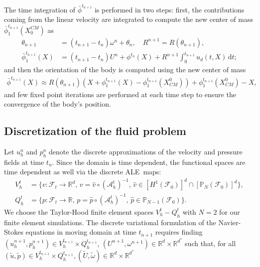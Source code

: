 \documentclass[graybox]{svmult}
\newcommand{\Fluid}{\mathcal{F}} %
\newcommand{\Alemap}{\mathcal{A}} %
\newcommand{\ALE}{ALE} %
\newcommand{\Vel}{u} %
\newcommand{\Pres}{p} %
\newcommand{\tvel}{U} %
\newcommand{\angvel}{\omega} %
\newcommand{\CompDomain}{\Fluid}
\begin{document}
The time integration of $\bar{\phi}^{t_{n+1}}$  is performed in two steps: first, the contributions coming from the linear velocity are integrated to compute the new center of mass $\bar{\phi}_1^{t_{n+1}}(X^{CM}_0) $ as
\begin{equation}
	\begin{aligned}
		\theta_{n+1}&= (t_{n+1}-t_n)\angvel^n + \theta_{n}, \quad R^{n+1} = R(\theta_{n+1}),\\
		\bar{\phi}_1^{t_{n+1}}(X) &= (t_{n+1}-t_n)\tvel^n + \phi^{t_{n}}(X) + R^{n+1}\int_0^{t_{n+1}} u_d(t,X)\, \mathrm{d}t;
	\end{aligned}
	\label{Eq:discDisp1}
\end{equation}
and then the orientation of the body is computed using the new center of mass
\begin{multline}
	\bar{\phi}^{t_{n+1}}(X) \approx  R(\theta_{n+1}) (X+\phi_1^{t_{n+1}}(X)-\phi_1^{t_{n+1}}(X_{CM}^{0})) + \phi_1^{t_{n+1}}(X_{CM}^0)-X,
	\label{Eq:discDisp2}
\end{multline}
and few fixed point iterations are performed at each time step to ensure the convergence of the body's position.


\subsection{Discretization of the fluid problem}

Let $\Vel_h^n$ and $\Pres_h^n$ denote the discrete approximations of the velocity and pressure fields at time $t_n$. Since the domain is time dependent, the functional spaces are time dependent as well via the discrete \ALE\ maps:
\begin{equation}
	\begin{aligned}
		V_h^t &= \{v: \CompDomain_t \to \mathbb{R}^d, \, v = \hat{v} \circ (\mathcal{A}_h^t)^{-1}, \, \hat{v} \in [H^1(\CompDomain_0)]^d \cap [\mathbb{P}_N(\CompDomain_0)]^d  \}, \\
		Q_h^t &= \{\Pres : \CompDomain_t \to \mathbb{R}, \, \Pres = \hat{\Pres} \circ (\Alemap_h^t)^{-1}, \, \hat{\Pres} \in\mathbb{P}_{N-1}(\CompDomain_0) \}.
	\end{aligned}
	\label{Eq:FEMspace}
\end{equation}
We choose the Taylor-Hood finite element spaces $V_h^t -Q_h^t $ with $N=2$ for our finite element simulations.
The discrete variational formulation of the Navier-Stokes equations in moving domain at time $t_{n+1}$ requires finding $(\Vel_h^{n+1}, \Pres_h^{n+1}) \in V_h^{t_{n+1}} \times Q_h^{t_{n+1}}$, $(\tvel^{n+1},\angvel^{n+1})\in \mathbb{R}^d\times \mathbb{R}^{d^*}$ such that, for all $(\tilde{\Vel},\tilde{\Pres}) \in V_{h}^{t_{n+1}} \times Q_h^{t_{n+1}}, (\tilde{\tvel},\tilde{\angvel}) \in \mathbb{R}^d\times \mathbb{R}^{d^*}$
\end{document}
